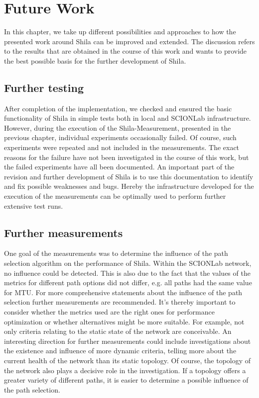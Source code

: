 \chapter{Future Work}
\label{chap:FutureWork}

In this chapter, we take up different possibilities and approaches to how the presented work around Shila can be improved and extended. The discussion refers to the results that are obtained in the course of this work and wants to provide the best possible basis for the further development of Shila.

\section*{Further testing}

After completion of the implementation, we checked and ensured the basic functionality of Shila in simple tests both in local and SCIONLab infrastructure. However, during the execution of the Shila-Measurement, presented in the previous chapter, individual experiments occasionally failed. Of course, such experiments were repeated and not included in the measurements. The exact reasons for the failure have not been investigated in the course of this work, but the failed experiments have all been documented. An important part of the revision and further development of Shila is to use this documentation to identify and fix possible weaknesses and bugs. Hereby the infrastructure developed for the execution of the measurements can be optimally used to perform further extensive test runs.

\section*{Further measurements}

One goal of the measurements was to determine the influence of the path selection algorithm on the performance of Shila. Within the SCIONLab network, no influence could be detected. This is also due to the fact that the values of the metrics for different path options did not differ, e.g. all paths had the same value for MTU. For more comprehensive statements about the influence of the path selection further measurements are recommended. It's thereby important to consider whether the metrics used are the right ones for performance optimization or whether alternatives might be more suitable. For example, not only criteria relating to the static state of the network are conceivable. An interesting direction for further measurements could include investigations about the existence and influence of more dynamic criteria, telling more about the current health of the network than its static topology. Of course, the topology of the network also plays a decisive role in the investigation. If a topology offers a greater variety of different paths, it is easier to determine a possible influence of the path selection.

